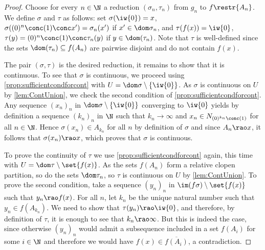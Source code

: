 \begin{proof}
Choose for every $n\in\N$ a reduction $(\sigma_n, \tau_n)$ from $g_n$ to $f\restr{A_n}$.
We define $\sigma$ and $\tau$ as follows: set $\sigma(\iw{0})=x$, $\sigma((0)^n\conc(1)\conc x')=\sigma_{n}(x')$ if $x'\in \dom \sigma_n$, and $\tau(f(x))=\iw{0}$,
$\tau(y)=(0)^n\conc(1)\conc\tau_n(y)$ if $y\in \dom(\tau_n)$. Note that $\tau$ is well-defined since the sets $\dom(\tau_n)\subseteq f(A_n)$ are pairwise disjoint and do not contain $f(x)$.

The pair $(\sigma,\tau)$ is the desired reduction, it remains to show that it is continuous.
To see that $\sigma$ is continuous, we proceed using \cref{prop:sufficientcondforcont} with $U=\dom \sigma \setminus \{\iw{0}\}$. %
As $\sigma$ is continuous on $U$ by \cref{lem:ContUnion}, we check the second condition of \cref{prop:sufficientcondforcont}.
Any sequence $(x_n)_n$ in $\dom \sigma \setminus \{\iw{0}\}$ converging to $\iw{0}$ yields by definition
a sequence $(k_n)_n$ in $\N$ such that $k_n\to \infty$ and $x_n\in N_{(0)^{k_n}\conc(1)}$ for all $n\in\N$.
Hence $\sigma(x_n)\in A_{k_n}$ for all $n$ by definition of $\sigma$ and since $A_n\rao x$, it follows that $\sigma(x_n)\rao x$, which proves that $\sigma$ is continuous.

To prove the continuity of $\tau$ we use \cref{prop:sufficientcondforcont} again, this time with $U=\dom \tau \setminus \set{f(x)}$. %
As the sets $f(A_n)$ form a relative clopen partition, so do the sets $\dom \tau_n$, so $\tau$ is continuous on $U$ by \cref{lem:ContUnion}. To prove the second condition, take a sequence $(y_n)_n$ in $\im (f\sigma) \setminus\set{f(x)}$ such that $y_n\rao f(x)$.
For all $n$, let $k_n$ be the unique natural number such that $y_n\in f(A_{k_n})$. We need to show that $\tau(y_n)\rao\iw{0}$, and therefore, by definition of $\tau$, it is enough to see that $k_n\rao\infty$.
But this is indeed the case, since otherwise $(y_n)_n$ would admit a subsequence included in a set $f(A_i)$ for some $i\in\N$
and therefore we would have $f(x)\in \overline{f(A_i)}$, a contradiction.
\end{proof}

